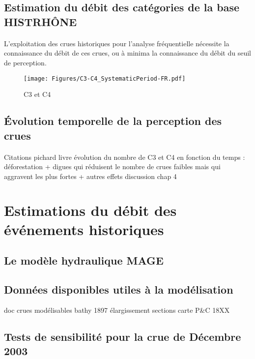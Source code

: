 \documentclass[11pt]{article}
\begin{document}
\FloatBarrier

	\subsection{Estimation du débit des catégories de la base HISTRHÔNE}
	
	\paragraph{} L'exploitation des crues historiques pour l'analyse fréquentielle nécessite la connaissance du débit de ces crues, ou à minima la connaissance du débit du seuil de perception. 
	
	
	\begin{figure}[h]
	\centering
		\texttt{[image: Figures/C3-C4\_SystematicPeriod-FR.pdf]}
        \caption{C3 et C4}
		\label{fig:C3-C4_Syst}
	\end{figure}
	
	\subsection{Évolution temporelle de la perception des crues}
	
	\paragraph{} Citations pichard livre
	évolution du nombre de C3 et C4 en fonction du temps : déforestation + digues qui réduisent le nombre de crues faibles mais qui aggravent les plus fortes + autres effets discussion chap 4
	

\section{Estimations du débit des événements historiques}

	\subsection{Le modèle hydraulique MAGE}
	
	\subsection{Données disponibles utiles à la modélisation}
	doc crues modélisables
	bathy 1897
	élargissement sections
	carte P\&C 18XX
	
	\subsection{Tests de sensibilité pour la crue de Décembre 2003}
	
\end{document}
